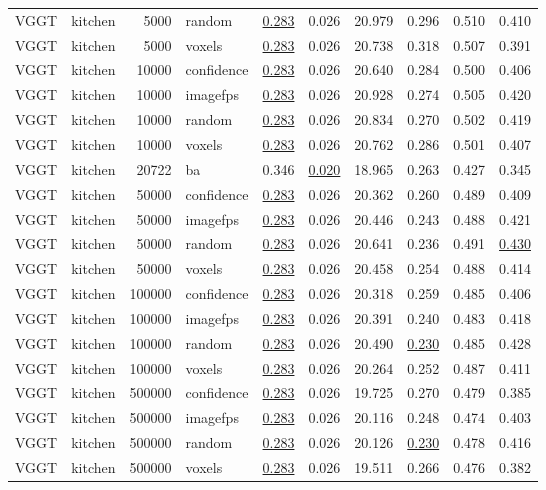 \begin{table}[H]
\begin{tabular}{llrlrrrrrr}
VGGT & kitchen & 5000 & random & \underline{0.283} & 0.026 & 20.979 & 0.296 & 0.510 & 0.410 \\
VGGT & kitchen & 5000 & voxels & \underline{0.283} & 0.026 & 20.738 & 0.318 & 0.507 & 0.391 \\
VGGT & kitchen & 10000 & confidence & \underline{0.283} & 0.026 & 20.640 & 0.284 & 0.500 & 0.406 \\
VGGT & kitchen & 10000 & imagefps & \underline{0.283} & 0.026 & 20.928 & 0.274 & 0.505 & 0.420 \\
VGGT & kitchen & 10000 & random & \underline{0.283} & 0.026 & 20.834 & 0.270 & 0.502 & 0.419 \\
VGGT & kitchen & 10000 & voxels & \underline{0.283} & 0.026 & 20.762 & 0.286 & 0.501 & 0.407 \\
VGGT & kitchen & 20722 & ba & 0.346 & \underline{0.020} & 18.965 & 0.263 & 0.427 & 0.345 \\
VGGT & kitchen & 50000 & confidence & \underline{0.283} & 0.026 & 20.362 & 0.260 & 0.489 & 0.409 \\
VGGT & kitchen & 50000 & imagefps & \underline{0.283} & 0.026 & 20.446 & 0.243 & 0.488 & 0.421 \\
VGGT & kitchen & 50000 & random & \underline{0.283} & 0.026 & 20.641 & 0.236 & 0.491 & \underline{0.430} \\
VGGT & kitchen & 50000 & voxels & \underline{0.283} & 0.026 & 20.458 & 0.254 & 0.488 & 0.414 \\
VGGT & kitchen & 100000 & confidence & \underline{0.283} & 0.026 & 20.318 & 0.259 & 0.485 & 0.406 \\
VGGT & kitchen & 100000 & imagefps & \underline{0.283} & 0.026 & 20.391 & 0.240 & 0.483 & 0.418 \\
VGGT & kitchen & 100000 & random & \underline{0.283} & 0.026 & 20.490 & \underline{0.230} & 0.485 & 0.428 \\
VGGT & kitchen & 100000 & voxels & \underline{0.283} & 0.026 & 20.264 & 0.252 & 0.487 & 0.411 \\
VGGT & kitchen & 500000 & confidence & \underline{0.283} & 0.026 & 19.725 & 0.270 & 0.479 & 0.385 \\
VGGT & kitchen & 500000 & imagefps & \underline{0.283} & 0.026 & 20.116 & 0.248 & 0.474 & 0.403 \\
VGGT & kitchen & 500000 & random & \underline{0.283} & 0.026 & 20.126 & \underline{0.230} & 0.478 & 0.416 \\
VGGT & kitchen & 500000 & voxels & \underline{0.283} & 0.026 & 19.511 & 0.266 & 0.476 & 0.382 \\

\end{tabular}
\end{table}

